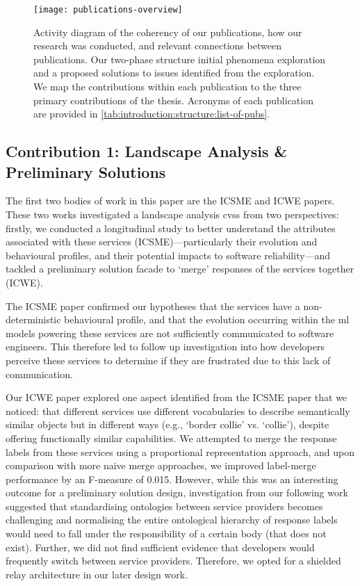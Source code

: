 \begin{figure}[t!]
  \texttt{[image: publications-overview]}
  \caption[Overview publication coherency]{Activity diagram of the coherency of our publications, how our research was conducted, and relevant connections between publications. Our two-phase structure initial phenomena exploration and a proposed solutions to issues identified from the exploration. We map the contributions within each publication to the three primary contributions of the thesis. Acronyms of each publication are provided in \cref{tab:introduction:structure:list-of-pubs}.}
  \label{fig:introduction:structure:publications-overview}
\end{figure}

\subsection{Contribution 1: Landscape Analysis \& Preliminary Solutions}

The first two bodies of work in this paper are the ICSME and ICWE papers. These two works investigated a landscape analysis \glspl{cvs} from two perspectives: firstly, we conducted a longitudinal study to better understand the attributes associated with these services (ICSME)---particularly their evolution and behavioural profiles, and their potential impacts to software reliability---and tackled a preliminary solution facade to `merge' responses of the services together (ICWE). 

The ICSME paper confirmed our hypotheses that the services have a non-deterministic behavioural profile, and that the evolution occurring within the \gls{ml} models powering these services are not sufficiently communicated to software engineers. This therefore led to follow up investigation into how developers perceive these services to determine if they are frustrated due to this lack of communication. 

Our ICWE paper explored one aspect identified from the ICSME paper that we noticed: that different services use different vocabularies to describe semantically similar objects but in different ways (e.g., `border collie' vs. `collie'), despite offering functionally similar capabilities. We attempted to merge the response labels from these services using a proportional representation approach, and upon comparison with more naive merge approaches, we improved label-merge performance by an F-measure of 0.015. However, while this was an interesting outcome for a preliminary solution design, investigation from our following work suggested that standardising ontologies between service providers becomes challenging and normalising the entire ontological hierarchy of response labels would need to fall under the responsibility of a certain body (that does not exist). Further, we did not find sufficient evidence that developers would frequently switch between service providers. Therefore, we opted for a shielded relay architecture in our later design work.  

